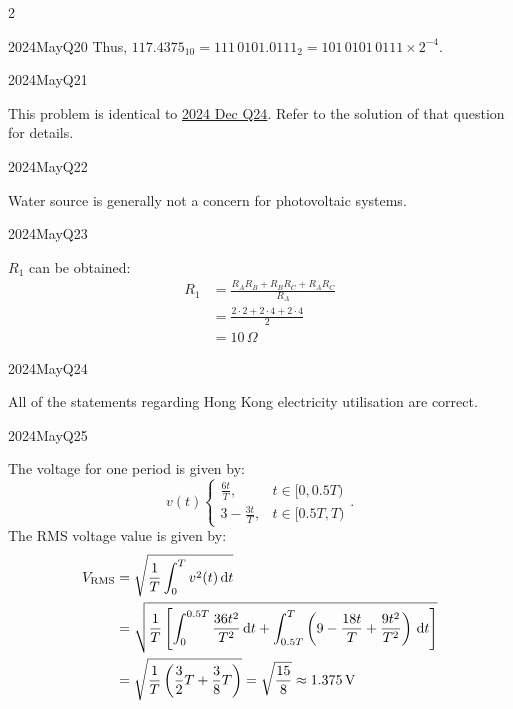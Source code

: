 \begin{multicols}{2}
\begin{qsolution}{2024}{May}{Q20}{\tgCE \tgCEFixedPointRepr}
    Thus, $117.4375_{10}=111\,0101.0111_2=101\,0101\,0111\times 2^{-4}$.
\end{qsolution}

\begin{qsolution}{2024}{May}{Q21}{\tgEE \tgEEThreePhase}

    This problem is identical to \hyperref[q:2024-dec-mcq24]{2024 Dec Q24}.
    Refer to the solution of that question for details.
\end{qsolution}

\begin{qsolution}{2024}{May}{Q22}{\tgEE \tgEERenewableEnergy}

    Water source is generally not a concern for photovoltaic systems.
\end{qsolution}

\begin{qsolution}[20]{2024}{May}{Q23}{\tgEE \tgEEDeltaY}

    $R_1$ can be obtained:
    \begin{align*}
        R_1 &= \frac{R_AR_B+R_BR_C+R_AR_C}{R_A}\\
        &= \frac{2\cdot 2+2\cdot 4+2\cdot 4}{2}\\
        &= \boxed{10\,\Omega}
    \end{align*}
\end{qsolution}

\begin{qsolution}{2024}{May}{Q24}{\tgEE \tgEEHKElec}

    All of the statements regarding Hong Kong electricity utilisation are correct.
\end{qsolution}

\begin{qsolution}{2024}{May}{Q25}{\tgEE \tgEERMS}
    
    The voltage for one period is given by:
    \[
        v(t)\begin{cases}
            \frac{6t}{T}, & t\in[0, 0.5T) \\
            3-\frac{3t}{T}, & t\in[0.5T, T)
        \end{cases}.
    \]
    The RMS voltage value is given by:
    \begin{align*}
        V_{\mathrm{RMS}} &= \sqrt{\frac{1}{T}\int_0^{T} v^2(t) \,\mathrm{d} t} \\
        &= \sqrt{\frac{1}{T}\left[\int_{0}^{0.5T}\frac{36t^2}{T^2}\,\mathrm{d} t+\int_{0.5T}^{T}\left(9-\frac{18t}{T}+\frac{9t^2}{T^2}\right)\,\mathrm{d} t\right]} \\
        &= \sqrt{\frac{1}{T}\left(\frac{3}{2}T+\frac{3}{8}T\right)} = \sqrt{\frac{15}{8}} \approx 1.375\,\mathrm{V}
    \end{align*}
\end{qsolution}


\end{multicols}
